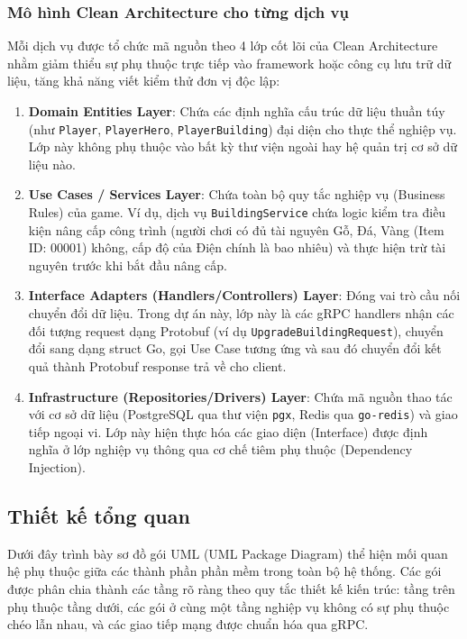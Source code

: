 \documentclass[../Project.tex]{subfiles}
\begin{document}
\subsubsection{Mô hình Clean Architecture cho từng dịch vụ}
Mỗi dịch vụ được tổ chức mã nguồn theo 4 lớp cốt lõi của Clean Architecture nhằm giảm thiểu sự phụ thuộc trực tiếp vào framework hoặc công cụ lưu trữ dữ liệu, tăng khả năng viết kiểm thử đơn vị độc lập:
\begin{enumerate}
    \item \textbf{Domain Entities Layer}: Chứa các định nghĩa cấu trúc dữ liệu thuần túy (như \texttt{Player}, \texttt{PlayerHero}, \texttt{PlayerBuilding}) đại diện cho thực thể nghiệp vụ. Lớp này không phụ thuộc vào bất kỳ thư viện ngoài hay hệ quản trị cơ sở dữ liệu nào.
    \item \textbf{Use Cases / Services Layer}: Chứa toàn bộ quy tắc nghiệp vụ (Business Rules) của game. Ví dụ, dịch vụ \texttt{BuildingService} chứa logic kiểm tra điều kiện nâng cấp công trình (người chơi có đủ tài nguyên Gỗ, Đá, Vàng (Item ID: 00001) không, cấp độ của Điện chính là bao nhiêu) và thực hiện trừ tài nguyên trước khi bắt đầu nâng cấp.
    \item \textbf{Interface Adapters (Handlers/Controllers) Layer}: Đóng vai trò cầu nối chuyển đổi dữ liệu. Trong dự án này, lớp này là các gRPC handlers nhận các đối tượng request dạng Protobuf (ví dụ \texttt{UpgradeBuildingRequest}), chuyển đổi sang dạng struct Go, gọi Use Case tương ứng và sau đó chuyển đổi kết quả thành Protobuf response trả về cho client.
    \item \textbf{Infrastructure (Repositories/Drivers) Layer}: Chứa mã nguồn thao tác với cơ sở dữ liệu (PostgreSQL qua thư viện \texttt{pgx}, Redis qua \texttt{go-redis}) và giao tiếp ngoại vi. Lớp này hiện thực hóa các giao diện (Interface) được định nghĩa ở lớp nghiệp vụ thông qua cơ chế tiêm phụ thuộc (Dependency Injection).
\end{enumerate}

\subsection{Thiết kế tổng quan}
\label{sec:thiet_ke_tong_quan}

Dưới đây trình bày sơ đồ gói UML (UML Package Diagram) thể hiện mối quan hệ phụ thuộc giữa các thành phần phần mềm trong toàn bộ hệ thống. Các gói được phân chia thành các tầng rõ ràng theo quy tắc thiết kế kiến trúc: tầng trên phụ thuộc tầng dưới, các gói ở cùng một tầng nghiệp vụ không có sự phụ thuộc chéo lẫn nhau, và các giao tiếp mạng được chuẩn hóa qua gRPC.
\end{document}
